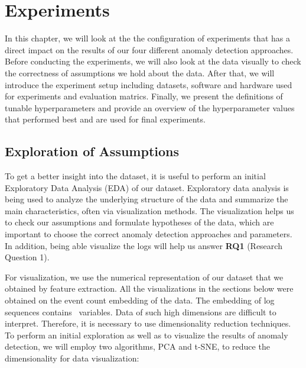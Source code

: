 \chapter{Experiments}
\label{chapter:experiments}

In this chapter, we will look at the the configuration of experiments that has a direct impact on the results of our four different anomaly detection approaches. Before conducting the experiments, we will also look at the data visually to check the correctness of assumptions we hold about the data. After that, we will introduce the experiment setup including datasets, software and hardware used for experiments and evaluation matrics. Finally, we present the definitions of tunable hyperparameters and provide an overview of the hyperparameter values that performed best and are used for final experiments.

\section{Exploration of Assumptions}
To get a better insight into the dataset, it is useful to perform an initial Exploratory Data Analysis (EDA) \cite{eda} of our dataset. Exploratory data analysis is being used to analyze the underlying structure of the data and summarize the main characteristics, often via visualization methods. The visualization helps us to check our assumptions and formulate hypotheses of the data, which are important to choose the correct anomaly detection approaches and parameters. In addition, being able visualize the logs will help us answer \textbf{RQ1} (Research Question 1).

For visualization, we use the numerical representation of our dataset that we obtained by feature extraction. All the visualizations in the sections below were obtained on the event count embedding of the data. The embedding of log sequences contains \featureVectorLength\ variables. Data of such high dimensions are difficult to interpret. Therefore, it is necessary to use dimensionality reduction techniques. To perform an initial exploration as well as to visualize the results of anomaly detection, we will employ two algorithms, PCA and t-SNE, to reduce the dimensionality for data visualization:


